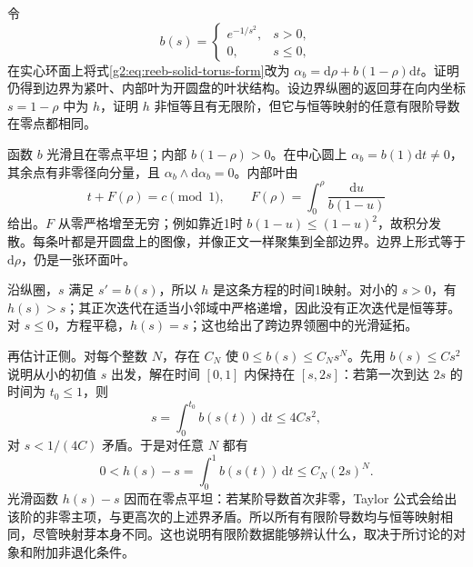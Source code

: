 \begin{exercise}\label{g2:ex:flat-reeb-holonomy}
	令
	\[
		b(s)=\begin{cases}e^{-1/s^2},&s>0,\\0,&s\le0,\end{cases}
	\]
	在实心环面上将式\eqref{g2:eq:reeb-solid-torus-form}改为 \(\alpha_b=\mathrm d\rho+b(1-\rho)\mathrm dt\)。证明仍得到边界为紧叶、内部叶为开圆盘的叶状结构。设边界纵圈的返回芽在向内坐标 \(s=1-\rho\) 中为 \(h\)，证明 \(h\) 非恒等且有无限阶，但它与恒等映射的任意有限阶导数在零点都相同。
\end{exercise}
\begin{solution}
	函数 \(b\) 光滑且在零点平坦；内部 \(b(1-\rho)>0\)。在中心圆上 \(\alpha_b=b(1)\mathrm dt\ne0\)，其余点有非零径向分量，且 \(\alpha_b\wedge\mathrm d\alpha_b=0\)。内部叶由
	\[
		t+F(\rho)=c\pmod1,\qquad
		F(\rho)=\int_0^\rho\frac{\mathrm du}{b(1-u)}
	\]
	给出。\(F\) 从零严格增至无穷；例如靠近1时 \(b(1-u)\le(1-u)^2\)，故积分发散。每条叶都是开圆盘上的图像，并像正文一样聚集到全部边界。边界上形式等于 \(\mathrm d\rho\)，仍是一张环面叶。

	沿纵圈，\(s\) 满足 \(s'=b(s)\)，所以 \(h\) 是这条方程的时间1映射。对小的 \(s>0\)，有 \(h(s)>s\)；其正次迭代在适当小邻域中严格递增，因此没有正次迭代是恒等芽。对 \(s\le0\)，方程平稳，\(h(s)=s\)；这也给出了跨边界领圈中的光滑延拓。

	再估计正侧。对每个整数 \(N\)，存在 \(C_N\) 使 \(0\le b(s)\le C_Ns^N\)。先用 \(b(s)\le Cs^2\) 说明从小的初值 \(s\) 出发，解在时间 \([0,1]\) 内保持在 \([s,2s]\)：若第一次到达 \(2s\) 的时间为 \(t_0\le1\)，则
	\[
		s=\int_0^{t_0}b(s(t))\,\mathrm dt\le4Cs^2,
	\]
	对 \(s<1/(4C)\) 矛盾。于是对任意 \(N\) 都有
	\[
		0<h(s)-s=\int_0^1b(s(t))\,\mathrm dt\le C_N(2s)^N.
	\]
	光滑函数 \(h(s)-s\) 因而在零点平坦：若某阶导数首次非零，Taylor 公式会给出该阶的非零主项，与更高次的上述界矛盾。所以所有有限阶导数均与恒等映射相同，尽管映射芽本身不同。这也说明有限阶数据能够辨认什么，取决于所讨论的对象和附加非退化条件。
\end{solution}

